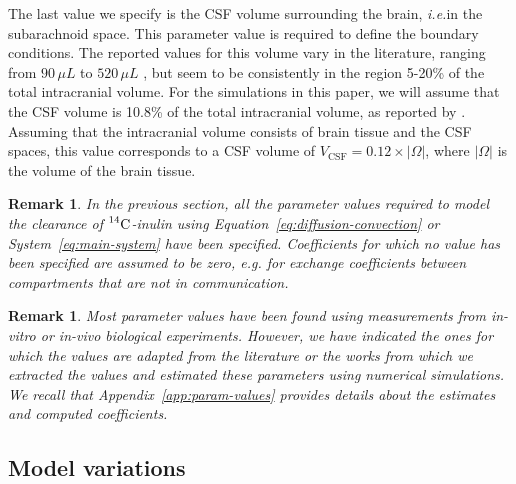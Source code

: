 \documentclass[a4paper,11pt]{article}
\newcommand{\ie}{\emph{i.e.}\;}
\newcommand{\1}{^{(1)}}
\newcommand{\2}{^{(2)}}
\newcommand{\Cinulin}{$\prescript{14}{}{\text{C}}$-inulin }
\newtheorem{remark}[theorem]{Remark}
\begin{document}
The last value we specify is the CSF volume surrounding the brain, \ie in the subarachnoid space. This parameter value is required to define the boundary conditions.  
The reported values for this volume vary in the literature, ranging from $90 \, \si{\mu L}$ \cite{pardridge2011drug} to $520 \, \si{\mu L}$ \cite{lai1983sampling}, but seem to be consistently in the region 5-20\% of the total intracranial volume. For the simulations in this paper, we will assume that the CSF volume is 10.8\% of the total intracranial volume, as reported by \cite{murtha2014cerebrospinal}. Assuming that the intracranial volume consists of brain tissue and the CSF spaces, this value corresponds to a CSF volume of $V_\text{CSF} = 0.12\times |\Omega|$, where $|\Omega|$ is the volume of the brain tissue.

\begin{remark}
In the previous section, all the parameter values required to model the clearance of \Cinulin using Equation~\eqref{eq:diffusion-convection} or System~\eqref{eq:main-system} have been specified. Coefficients for which no value has been specified are assumed to be zero, e.g. for exchange coefficients between compartments that are not in communication.
\end{remark}

\begin{remark}
Most parameter values have been found using measurements from \textit{in-vitro} or \textit{in-vivo} biological experiments. However, we have indicated the ones for which the values are adapted from the literature or the works from which we extracted the values and estimated these parameters using numerical simulations. We recall that Appendix~\ref{app:param-values} provides details about the estimates and computed coefficients.
\end{remark}

\subsection{Model variations}\label{subsec:var}
\end{document}
